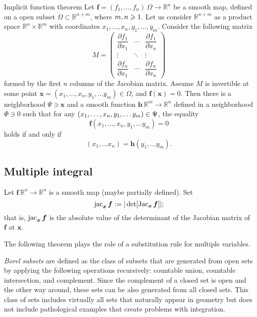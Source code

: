 \begin{thm}{Implicit function theorem}\label{thm:imlicit}
Let $\bm{f}=(f_1,\dots,f_n)\:\Omega\to\mathbb{R}^n$ be a smooth map, defined on a open subset $\Omega\subset\mathbb{R}^{n+m}$, where
$m,n\z\ge 1$.
Let us consider $\mathbb{R}^{n+m}$ as a product space $\mathbb{R}^n\times \mathbb{R}^m$ with coordinates 
$x_1,\dots,x_n,y_1,\dots,y_m$.
Consider the following matrix 
\[
M=\begin{pmatrix}
\dfrac{\partial f_1}{\partial x_1} & \cdots & \dfrac{\partial f_1}{\partial x_n}\\
\vdots & \ddots & \vdots\\
\dfrac{\partial f_n}{\partial x_1} & \cdots & \dfrac{\partial f_n}{\partial x_n} \end{pmatrix}\]
formed by the first $n$ columns of the Jacobian matrix.
Assume $M$ is invertible at some point $\bm{x}=(x_1,\dots,x_n,y_1,\dots y_m)\in \Omega$, and $\bm{f}(\bm{x})=0$.
Then there is a neighborhood $\Psi\ni \bm{x}$
and a smooth function $\bm{h}\:\mathbb{R}^m\to\mathbb{R}^n$ defined in a neighborhood $\Phi\ni 0$ such that
for any $(x_1,\dots,x_n,y_1,\dots y_m)\z\in \Psi$, the equality
\[\bm{f}(x_1,\dots,x_n,y_1,\dots y_m)=0\]
holds if and only if 
\[(x_1,\dots x_n)=\bm{h}(y_1,\dots y_m).\]

\end{thm}

\subsection*{Multiple integral}

Let $\bm{f}\:\mathbb{R}^n\to\mathbb{R}^n$ is a smooth map (maybe partially defined).
Set
\[\jac_{\bm{x}}\bm{f}\df|\det[\Jac_{\bm{x}}\bm{f}]|;\index{10j@$\jac$}\]
that is, $\mathop{\rm jac}\nolimits_{\bm{x}}\bm{f}$ is the absolute value of the determinant of the Jacobian matrix of $\bm{f}$ at $\bm{x}$.

The following theorem plays the role of a substitution rule for multiple variables.

\emph{Borel subsets} are defined as the class of subsets that are generated from open sets by applying the following operations recursively: countable union, countable intersection, and complement.
Since the complement of a closed set is open and the other way around, these sets can be also generated from all closed sets.
This class of sets includes virtually all sets that naturally appear in geometry but does not include pathological examples that create problems with integration.

